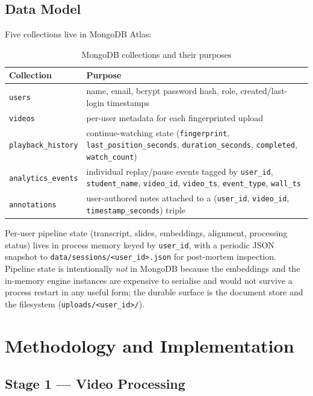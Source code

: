 \documentclass[conference]{IEEEtran}
\begin{document}
\subsection{Data Model}

Five collections live in MongoDB Atlas:

\begin{table}[ht]
\caption{MongoDB collections and their purposes}
\label{tab:collections}
\centering
\begin{tabular}{|l|p{5.2cm}|}
\hline
\textbf{Collection} & \textbf{Purpose} \\
\hline
\texttt{users} & name, email, bcrypt password hash, role, created/last-login timestamps \\
\hline
\texttt{videos} & per-user metadata for each fingerprinted upload \\
\hline
\texttt{playback\_history} & continue-watching state (\texttt{fingerprint}, \texttt{last\_position\_seconds}, \texttt{duration\_seconds}, \texttt{completed}, \texttt{watch\_count}) \\
\hline
\texttt{analytics\_events} & individual replay/pause events tagged by \texttt{user\_id}, \texttt{student\_name}, \texttt{video\_id}, \texttt{video\_ts}, \texttt{event\_type}, \texttt{wall\_ts} \\
\hline
\texttt{annotations} & user-authored notes attached to a (\texttt{user\_id}, \texttt{video\_id}, \texttt{timestamp\_seconds}) triple \\
\hline
\end{tabular}
\end{table}

Per-user pipeline state (transcript, slides, embeddings, alignment, processing status) lives in process memory keyed by \texttt{user\_id}, with a periodic JSON snapshot to \texttt{data/sessions/<user\_id>.json} for post-mortem inspection. Pipeline state is intentionally \textit{not} in MongoDB because the embeddings and the in-memory engine instances are expensive to serialise and would not survive a process restart in any useful form; the durable surface is the document store and the filesystem (\texttt{uploads/<user\_id>/}).

\section{Methodology and Implementation}\label{sec:impl}

\subsection{Stage 1 --- Video Processing}
\end{document}

